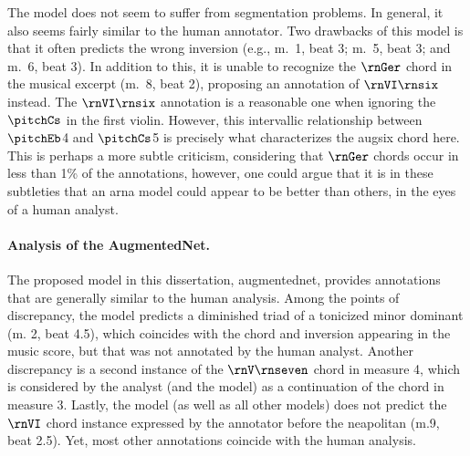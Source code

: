The \textcite{mcleod2021modular} model does not seem to
suffer from segmentation problems. In general, it also seems
fairly similar to the human annotator. Two drawbacks of this
model is that it often predicts the wrong inversion (e.g.,
m.~1, beat 3; m.~5, beat 3; and m.~6, beat 3). In addition
to this, it is unable to recognize the $\rnGer$ chord in the
musical excerpt (m.~8, beat 2), proposing an annotation of
$\rnVI\rnsix$ instead. The $\rnVI\rnsix$ annotation is a
reasonable one when ignoring the $\pitchCs$ in the first
violin. However, this intervallic relationship between
$\pitchEb$4 and $\pitchCs$5 is precisely what characterizes
the \gls{augsix} chord here. This is perhaps a more subtle
criticism, considering that $\rnGer$ chords occur in less
than 1\% of the annotations, however, one could argue that
it is in these subtleties that an \gls{arna} model could
appear to be better than others, in the eyes of a human
analyst.

\paragraph{Analysis of the AugmentedNet.}

The proposed model in this dissertation, \gls{augmentednet},
provides annotations that are generally similar to the human
analysis. Among the points of discrepancy, the model
predicts a diminished triad of a tonicized minor dominant
(m. 2, beat 4.5), which coincides with the chord and
inversion appearing in the music score, but that was not
annotated by the human analyst. Another discrepancy is a
second instance of the $\rnV\rnseven$ chord in measure 4,
which is considered by the analyst (and the
\textcite{mcleod2021modular} model) as a continuation of the
chord in measure 3. Lastly, the model (as well as all other
models) does not predict the $\rnVI$ chord instance
expressed by the annotator before the \gls{neapolitan} (m.9,
beat 2.5). Yet, most other annotations coincide with the
human analysis.

